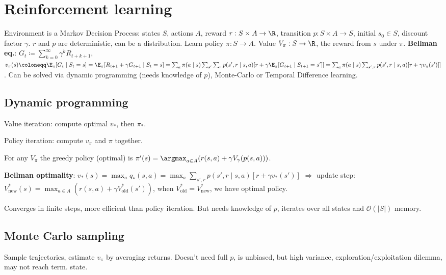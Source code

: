 \section{Reinforcement learning}

Environment is a Markov Decision Process:
states $S$, actions $A$,
reward $r : S \times A \to \R$,
transition $p: S \times A \to S$,
initial $s_0 \in S$,
discount factor $\gamma$.
$r$ and $p$ are deterministic, can be a distribution.
Learn policy $\pi : S \to A$.
Value $V_\pi: S \to \R$, the reward from $s$ under $\pi$.
\textbf{Bellman eq.}: $G_t \coloneqq \sum_{k = 0}^\infty \gamma^k R_{t + k + 1},$
$v_\pi(s) \coloneqq \E_\pi[G_t \mid S_t = s]
= \E_\pi[R_{t+1} + \gamma G_{t+1} \mid S_t = s]
= \sum_a \pi(a \mid s) \sum_{s'} \sum_r p(s', r \mid s, a)[r + \gamma \E_\pi[G_{t+1} \mid S_{t+1} = s']]
= \sum_a \pi(a \mid s) \sum_{s', r} p(s', r \mid s, a)[r + \gamma v_\pi(s')]]$.
Can be solved via dynamic programming (needs knowledge of $p$),
Monte-Carlo or Temporal Difference learning.

\subsection{Dynamic programming}

Value iteration: compute optimal $v_*$, then $\pi_*$.

Policy iteration: compute $v_\pi$ and $\pi$ together.

For any $V_\pi$ the greedy policy (optimal) is
$\pi'(s) = \argmax_{a \in A}(r(s, a) + \gamma V_\gamma(p(s, a)))$.

\textbf{Bellman optimality}: $v_*(s) = \max_a q_*(s, a)
= \max_a \sum_{s', r} p(s', r \mid s, a)[r + \gamma v_*(s')]$
$ \Rightarrow $ update step:
$V_{\mathrm{new}}^*(s) = \max_{a \in A} (r(s, a) + \gamma V_{\mathrm{old}}^*(s'))$,
when $V_{\mathrm{old}}^* = V_{\mathrm{new}}^*$, we have optimal policy.

Converges in finite steps, more efficient than policy iteration.
But needs knowledge of $p$,
iterates over all states and $\mathcal{O}(|S|)$ memory.

\subsection{Monte Carlo sampling}

Sample trajectories, estimate $v_\pi$ by averaging returns.
Doesn't need full $p$, is unbiased,
but high variance, exploration/exploitation dilemma, may not reach term. state.

